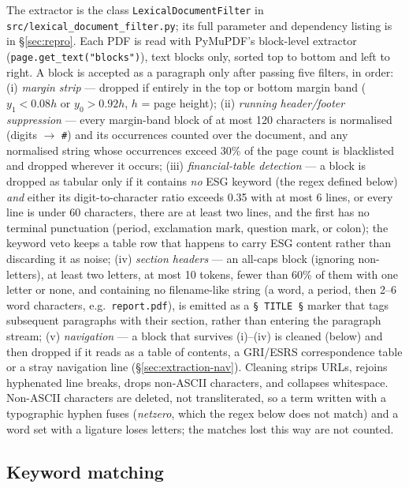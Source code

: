 The extractor is the class \texttt{LexicalDocumentFilter} in
\nolinkurl{src/lexical_document_filter.py}; its full parameter and dependency
listing is in \S\ref{sec:repro}. Each PDF is read with PyMuPDF's block-level
extractor (\texttt{page.get\_text("blocks")}), text blocks only, sorted
top to bottom and left to right. A block is accepted as a paragraph only
after passing five filters, in order: (i) \emph{margin strip} — dropped if entirely in the top
or bottom margin band ($y_1 < 0.08h$ or $y_0 > 0.92h$, $h$ = page height);
(ii) \emph{running header/footer suppression} — every margin-band block of
at most 120 characters is normalised (digits $\to$ \texttt{\#}) and its
occurrences counted over the document, and any normalised string whose
occurrences exceed 30\% of the page count is blacklisted and dropped wherever
it occurs; (iii)
\emph{financial-table detection} — a block is dropped as tabular only if it
contains \emph{no} ESG keyword (the regex defined below) \emph{and} either
its digit-to-character ratio exceeds 0.35 with at most 6 lines, or every
line is under 60 characters, there are at least two lines, and the first has
no terminal punctuation (period, exclamation mark, question mark, or colon);
the keyword veto keeps a table row that happens to carry ESG content rather
than discarding it as noise; (iv) \emph{section headers} — an all-caps block
(ignoring non-letters), at least two letters, at most 10 tokens, fewer than 60\% of
them with one letter or none, and containing no filename-like string (a
word, a period, then 2--6 word characters, e.g.\ \texttt{report.pdf}), is
emitted as a \texttt{\S~TITLE~\S} marker that tags
subsequent paragraphs with their section, rather than entering the
paragraph stream; (v) \emph{navigation} — a block that survives (i)--(iv) is
cleaned (below) and then dropped if it reads as a table of contents,
a GRI/ESRS correspondence table or a stray navigation line
(\S\ref{sec:extraction-nav}).
Cleaning strips URLs, rejoins hyphenated line breaks, drops non-ASCII
characters, and collapses whitespace. Non-ASCII characters are deleted, not
transliterated, so a term written with a typographic hyphen fuses
(\emph{netzero}, which the regex below does not match) and a word set with a
ligature loses letters; the matches lost this way are not counted.

\subsection{Keyword matching}
\label{sec:extraction-regex}

